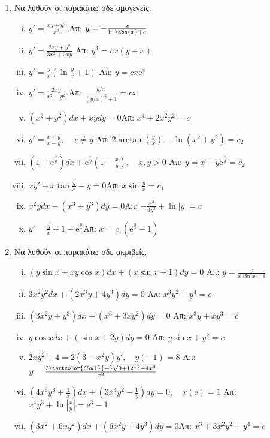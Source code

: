 \begin{enumerate}
  \item Να λυθούν οι παρακάτω σδε ομογενείς.

    \begin{enumerate}[i)]
      \item $ y' = \frac{xy+y^{2}}{x^{2}} $ %
        \hfill Απ: $ y= - \frac{x}{\ln{\abs{x} } + c} $ 
      \item $ y' = \frac{2xy+y^{2}}{3x^{2}+2xy} $ %
        \hfill Απ: $ y^{3}=cx(y+x) $ 
      \item $ y' = \frac{y}{x} (\ln{\frac{y}{x}} +1) $ %
        \hfill Απ: $ y=cx \mathrm{e}^{x} $ 
      \item $ y' = \frac{2xy}{x^{2}-y^{2}} $ %
        \hfill Απ: $ \frac{y/x}{(y/x)^{2}+1} = cx $ 
      \item $(x^2+y^2)dx+xydy=0$\hfill Απ: $x^4+2x^2y^2=c$
      \item $y'=\frac{x+y}{x-y}, \quad x\neq y$
        \hfill Απ: $2\arctan (\frac{y}{x})-\ln (x^2+y^2)=c_2$
      \item $(1+ \mathrm{e}^{\frac{x}{y}})dx+ \mathrm{e}^{\frac{x}{y}}(1-\frac{x}{y}), 
        \quad x,y>0$
        \hfill Απ: $y=x+y \mathrm{e}^{\frac{x}{y}}=c_2$
      \item $xy'+x\tan \frac{y}{x}-y=0$\hfill Απ: $x\sin \frac{y}{x}=c_1$
      \item $x^2ydx-(x^3+y^3)dy=0$\hfill Απ: $-\frac{x^3}{3y^2}+\ln|y|=c$
      \item $y'=\frac{y}{x}+1- \mathrm{e}^{\frac{y}{x}}$\hfill Απ: $x=c_1(
        \mathrm{e}^{\frac{y}{x}}-1)$
    \end{enumerate}

  \item Να λυθούν οι παρακάτω σδε ακριβείς.

    \begin{enumerate}[i)]
      \item $ (y \sin{x} + xy \cos{x})dx + (x \sin{x} +1) dy=0 $ %
        \hfill Απ: $ y= \frac{c}{x \sin{x} +1} $ 
      \item $ 3x^{2}y^{2}dx+(2x^{3}y+4y^{3})dy=0$  %
        \hfill Απ: $ x^{3}y^{2}+y^{4}=c $
      \item $ (3x^{2}y+y^{3})dx+(x^{3}+3xy^{2})dy=0 $ %
        \hfill Απ: $ x^{3}y+xy^{3}=c $
      \item $ y \cos{x} dx + (\sin{x} + 2y)dy=0 $ %
        \hfill Απ: $ y \sin{x} + y^{2}=c $ 
      \item $ 2xy^{2}+4 = 2(3-x^{2}y)y', \quad y(-1)=8 $ %
        \hfill Απ: $ y= \frac{3 \textcolor{Col1}{+} \sqrt{9+12x^{2}-4x^{3}}}{x^{2}} $ 
      \item $(4x^3y^3+\frac{1}{x})dx+(3x^4y^2-\frac{1}{y})dy=0, \quad x(\mathrm{e})=1$
        \hfill Απ: $x^4y^3+\ln |\frac{x}{y}|= \mathrm{e}^3-1$
      \item $(3x^2+6xy^2)dx+(6x^2y+4y^3)dy=0$\hfill Απ: $x^3+3x^2y^2+y^4=c$
    \end{enumerate}


\end{enumerate}

